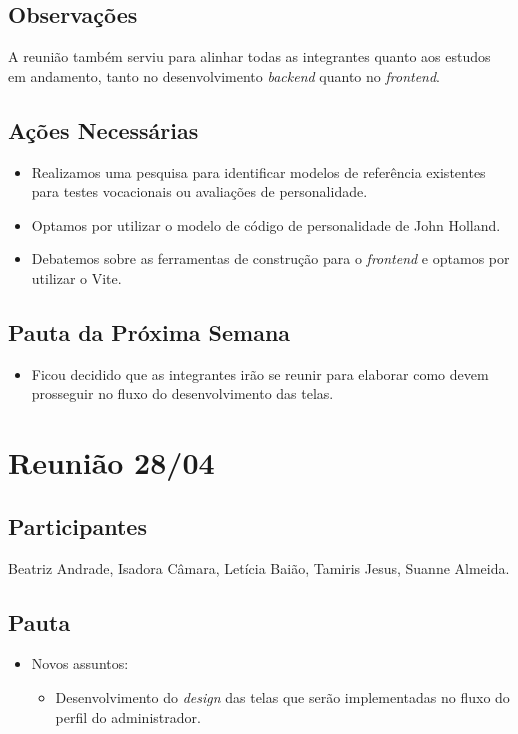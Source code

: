 \begin{apendicesenv}
\subsection*{Observações}
A reunião também serviu para alinhar todas as integrantes quanto aos estudos em andamento, tanto no desenvolvimento \textit{backend} quanto no \textit{frontend}.

\subsection*{Ações Necessárias}
\begin{itemize}
    \item Realizamos uma pesquisa para identificar modelos de referência existentes para testes vocacionais ou avaliações de personalidade.
    \item Optamos por utilizar o modelo de código de personalidade de John Holland.
    \item Debatemos sobre as ferramentas de construção para o \textit{frontend} e optamos por utilizar o Vite.
\end{itemize}

\subsection*{Pauta da Próxima Semana}
\begin{itemize}
    \item Ficou decidido que as integrantes irão se reunir para elaborar como devem prosseguir no fluxo do desenvolvimento das telas.
\end{itemize}

\section*{Reunião 28/04}

\subsection*{Participantes}
Beatriz Andrade, Isadora Câmara, Letícia Baião, Tamiris Jesus, Suanne Almeida.

\subsection*{Pauta}
\begin{itemize}
    \item Novos assuntos:
    \begin{itemize}
        \item Desenvolvimento do \textit{design} das telas que serão implementadas no fluxo do perfil do administrador.
    \end{itemize}
\end{itemize}


\end{apendicesenv}
